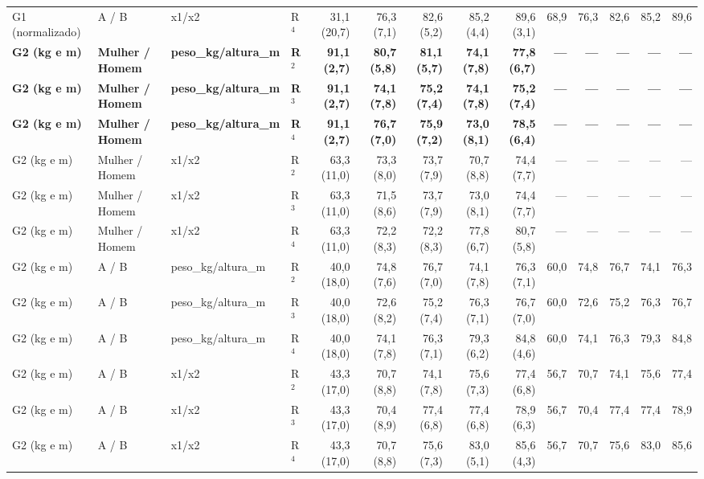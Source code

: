 \begin{table}[htbp]
\begin{tabular}{llllrrrrrrrrrr}
G1 (normalizado) & A / B & x1/x2 & R$^4$ & 31,1 (20,7) & 76,3 (7,1) & 82,6 (5,2) & 85,2 (4,4) & 89,6 (3,1) & 68,9 & 76,3 & 82,6 & 85,2 & 89,6 \\
\textbf{G2 (kg e m)} & \textbf{Mulher / Homem} & \textbf{peso\_kg/altura\_m} & \textbf{R$^2$} & \textbf{91,1 (2,7)} & \textbf{80,7 (5,8)} & \textbf{81,1 (5,7)} & \textbf{74,1 (7,8)} & \textbf{77,8 (6,7)} & \textbf{—} & \textbf{—} & \textbf{—} & \textbf{—} & \textbf{—} \\
\textbf{G2 (kg e m)} & \textbf{Mulher / Homem} & \textbf{peso\_kg/altura\_m} & \textbf{R$^3$} & \textbf{91,1 (2,7)} & \textbf{74,1 (7,8)} & \textbf{75,2 (7,4)} & \textbf{74,1 (7,8)} & \textbf{75,2 (7,4)} & \textbf{—} & \textbf{—} & \textbf{—} & \textbf{—} & \textbf{—} \\
\textbf{G2 (kg e m)} & \textbf{Mulher / Homem} & \textbf{peso\_kg/altura\_m} & \textbf{R$^4$} & \textbf{91,1 (2,7)} & \textbf{76,7 (7,0)} & \textbf{75,9 (7,2)} & \textbf{73,0 (8,1)} & \textbf{78,5 (6,4)} & \textbf{—} & \textbf{—} & \textbf{—} & \textbf{—} & \textbf{—} \\
G2 (kg e m) & Mulher / Homem & x1/x2 & R$^2$ & 63,3 (11,0) & 73,3 (8,0) & 73,7 (7,9) & 70,7 (8,8) & 74,4 (7,7) & — & — & — & — & — \\
G2 (kg e m) & Mulher / Homem & x1/x2 & R$^3$ & 63,3 (11,0) & 71,5 (8,6) & 73,7 (7,9) & 73,0 (8,1) & 74,4 (7,7) & — & — & — & — & — \\
G2 (kg e m) & Mulher / Homem & x1/x2 & R$^4$ & 63,3 (11,0) & 72,2 (8,3) & 72,2 (8,3) & 77,8 (6,7) & 80,7 (5,8) & — & — & — & — & — \\
G2 (kg e m) & A / B & peso\_kg/altura\_m & R$^2$ & 40,0 (18,0) & 74,8 (7,6) & 76,7 (7,0) & 74,1 (7,8) & 76,3 (7,1) & 60,0 & 74,8 & 76,7 & 74,1 & 76,3 \\
G2 (kg e m) & A / B & peso\_kg/altura\_m & R$^3$ & 40,0 (18,0) & 72,6 (8,2) & 75,2 (7,4) & 76,3 (7,1) & 76,7 (7,0) & 60,0 & 72,6 & 75,2 & 76,3 & 76,7 \\
G2 (kg e m) & A / B & peso\_kg/altura\_m & R$^4$ & 40,0 (18,0) & 74,1 (7,8) & 76,3 (7,1) & 79,3 (6,2) & 84,8 (4,6) & 60,0 & 74,1 & 76,3 & 79,3 & 84,8 \\
G2 (kg e m) & A / B & x1/x2 & R$^2$ & 43,3 (17,0) & 70,7 (8,8) & 74,1 (7,8) & 75,6 (7,3) & 77,4 (6,8) & 56,7 & 70,7 & 74,1 & 75,6 & 77,4 \\
G2 (kg e m) & A / B & x1/x2 & R$^3$ & 43,3 (17,0) & 70,4 (8,9) & 77,4 (6,8) & 77,4 (6,8) & 78,9 (6,3) & 56,7 & 70,4 & 77,4 & 77,4 & 78,9 \\
G2 (kg e m) & A / B & x1/x2 & R$^4$ & 43,3 (17,0) & 70,7 (8,8) & 75,6 (7,3) & 83,0 (5,1) & 85,6 (4,3) & 56,7 & 70,7 & 75,6 & 83,0 & 85,6 \\

\end{tabular}
\end{table}
